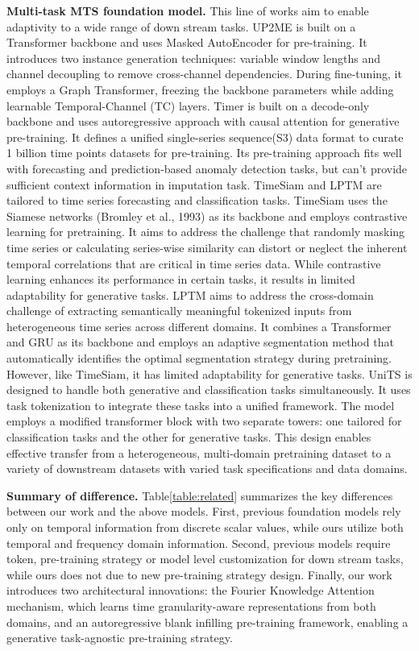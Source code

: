 {\bf Multi-task MTS foundation model.} 
This line of works aim to enable adaptivity to a wide 
range of down stream tasks.
UP2ME\cite{Zhang24} is built on a Transformer backbone and 
uses Masked AutoEncoder for pre-training.  
It introduces two instance generation techniques: variable window lengths and channel decoupling to remove cross-channel dependencies. During fine-tuning, it employs a Graph Transformer, freezing the backbone parameters while adding learnable Temporal-Channel (TC) layers. 
Timer\cite{Liu24} is built on a decode-only backbone and uses autoregressive approach with causal attention 
for generative pre-training. 
It defines a unified single-series sequence(S3) data format to curate 1 billion time points datasets for pre-training.  
Its pre-training approach fits well with forecasting and prediction-based anomaly detection tasks, but can’t provide sufficient context information in imputation task.  
TimeSiam \cite{Dong24} and LPTM\cite{Kamarthi23} are 
tailored to time series forecasting and classification tasks. 
TimeSiam uses the 
Siamese networks (Bromley et al., 1993) as its backbone and employs contrastive learning for pretraining. It aims to address the challenge that randomly masking time series or calculating series-wise similarity can distort or neglect the inherent temporal correlations that are critical in time series data. While contrastive learning enhances its performance in certain tasks, it results in limited adaptability for generative tasks.
LPTM\cite{Kamarthi23} aims to address the cross-domain challenge of extracting semantically meaningful tokenized inputs from heterogeneous time series across different domains. It combines a Transformer and GRU as its backbone and employs an adaptive segmentation method that automatically identifies the optimal segmentation strategy during pretraining. However, like TimeSiam, it has limited adaptability for generative tasks.   
UniTS \cite{gao24} is designed to handle both generative and classification tasks simultaneously. It uses task tokenization to integrate these tasks into a unified framework. The model employs a modified transformer block with two separate towers: one tailored for classification tasks and the other for generative tasks. This design enables effective transfer from a heterogeneous, multi-domain pretraining dataset to a variety of downstream datasets with varied task specifications and data domains.

 
{\bf Summary of difference.}   
Table\ref{table:related} summarizes the key differences between our work and the above models.
First, previous foundation models rely only on temporal information from discrete scalar values, while ours utilize both temporal and frequency domain information. 
Second, previous models require token, pre-training strategy or model level customization for down stream tasks, 
while ours does not due to new pre-training strategy design.   
Finally, our work introduces two architectural innovations: the Fourier Knowledge Attention mechanism, which learns time granularity-aware representations from both domains, and an autoregressive blank infilling pre-training framework, enabling a generative task-agnostic pre-training strategy.